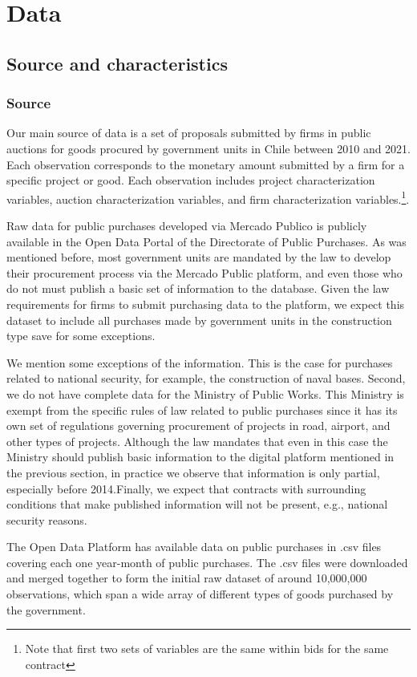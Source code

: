 
\chapter{Data}

\section{Source and characteristics}
\subsection{Source}
Our main source of data is a set of proposals submitted by firms in public auctions for goods procured by government units in Chile between 2010 and 2021. Each observation corresponds to the monetary amount submitted by a firm for a specific project or good. Each observation includes project characterization variables, auction characterization variables, and firm characterization variables.\footnote{Note that first two sets of variables are the same within bids for the same contract}.

Raw data for public purchases developed via Mercado Publico is publicly available in the Open Data Portal of the Directorate of Public Purchases. As was mentioned before, most government units are mandated by the law to develop their procurement process via the Mercado Public platform, and even those who do not must publish a basic set of information to the database. Given the law requirements for firms to submit purchasing data to the platform, we expect this dataset to include all purchases made by government units in the construction type save for some exceptions.

We mention some exceptions of the information. This is the case for purchases related to national security, for example, the construction of naval bases. Second, we do not have complete data for the Ministry of Public Works. This Ministry is exempt from the specific rules of law related to public purchases since it has its own set of regulations governing procurement of projects in road, airport, and other types of projects. Although the law mandates that even in this case the Ministry should publish basic information to the digital platform mentioned in the previous section, in practice we observe that information is only partial, especially before 2014.Finally, we expect that contracts with surrounding conditions that make published information will not be present, e.g., national security reasons.

The Open Data Platform has available  data on public purchases in .csv files covering each one year-month of public purchases. The .csv files were downloaded and merged together to form the initial raw dataset of around 10,000,000 observations, which span a wide array of different types of goods purchased by the government.

